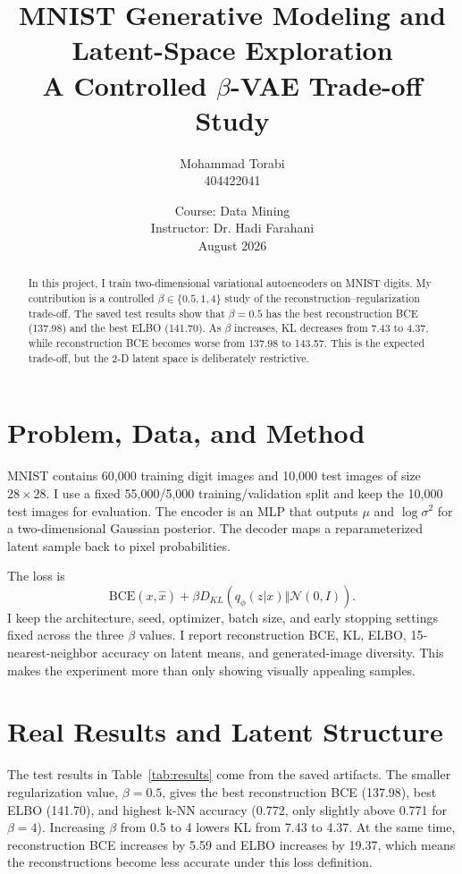 \documentclass[11pt,a4paper]{article}
\title{MNIST Generative Modeling and Latent-Space Exploration\\\large A Controlled $\beta$-VAE Trade-off Study}
\author{Mohammad Torabi \\ 404422041}
\date{Course: Data Mining \\ Instructor: Dr. Hadi Farahani \\ August 2026}
\begin{document}
\maketitle
\begin{abstract}
In this project, I train two-dimensional variational autoencoders on MNIST digits. My contribution is a controlled $\beta\in\{0.5,1,4\}$ study of the reconstruction--regularization trade-off. The saved test results show that $\beta=0.5$ has the best reconstruction BCE (137.98) and the best ELBO (141.70). As $\beta$ increases, KL decreases from 7.43 to 4.37, while reconstruction BCE becomes worse from 137.98 to 143.57. This is the expected trade-off, but the 2-D latent space is deliberately restrictive.
\end{abstract}

\section{Problem, Data, and Method}
MNIST contains 60,000 training digit images and 10,000 test images of size $28\times28$. I use a fixed 55,000/5,000 training/validation split and keep the 10,000 test images for evaluation. The encoder is an MLP that outputs $\mu$ and $\log\sigma^2$ for a two-dimensional Gaussian posterior. The decoder maps a reparameterized latent sample back to pixel probabilities.

The loss is
\[
\mathrm{BCE}(x,\hat{x})+\beta D_{KL}(q_\phi(z|x)\Vert\mathcal{N}(0,I)).
\]
I keep the architecture, seed, optimizer, batch size, and early stopping settings fixed across the three $\beta$ values. I report reconstruction BCE, KL, ELBO, 15-nearest-neighbor accuracy on latent means, and generated-image diversity. This makes the experiment more than only showing visually appealing samples.

\section{Real Results and Latent Structure}
The test results in Table~\ref{tab:results} come from the saved artifacts. The smaller regularization value, $\beta=0.5$, gives the best reconstruction BCE (137.98), best ELBO (141.70), and highest k-NN accuracy (0.772, only slightly above 0.771 for $\beta=4$). Increasing $\beta$ from 0.5 to 4 lowers KL from 7.43 to 4.37. At the same time, reconstruction BCE increases by 5.59 and ELBO increases by 19.37, which means the reconstructions become less accurate under this loss definition.
\end{document}
